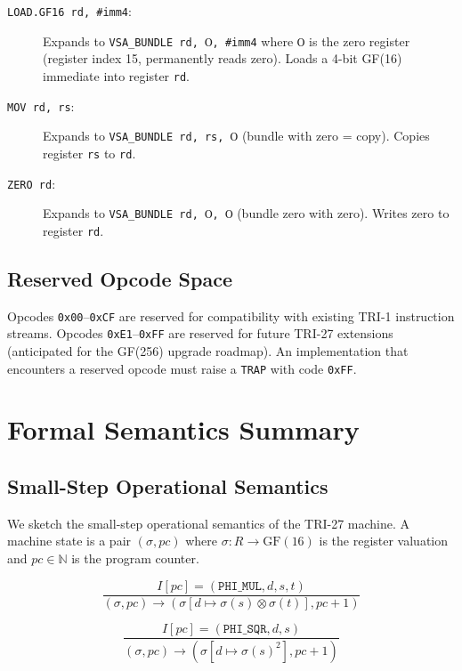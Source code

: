 \begin{description}
  \item[\texttt{LOAD.GF16 rd, \#imm4}:] Expands to
    \texttt{VSA\_BUNDLE rd, Ⲟ, \#imm4} where \texttt{Ⲟ} is the
    zero register (register index 15, permanently reads zero).
    Loads a 4-bit GF(16) immediate into register \texttt{rd}.
  \item[\texttt{MOV rd, rs}:] Expands to
    \texttt{VSA\_BUNDLE rd, rs, Ⲟ} (bundle with zero = copy).
    Copies register \texttt{rs} to \texttt{rd}.
  \item[\texttt{ZERO rd}:] Expands to
    \texttt{VSA\_BUNDLE rd, Ⲟ, Ⲟ} (bundle zero with zero).
    Writes zero to register \texttt{rd}.
\end{description}

\subsection{Reserved Opcode Space}
\label{subsec:71:reserved-opcodes}

Opcodes \texttt{0x00}--\texttt{0xCF} are reserved for compatibility
with existing TRI-1 instruction streams.  Opcodes \texttt{0xE1}--\texttt{0xFF}
are reserved for future TRI-27 extensions (anticipated for the
GF(256) upgrade roadmap).  An implementation that encounters a
reserved opcode must raise a \texttt{TRAP} with code \texttt{0xFF}.

\section{Formal Semantics Summary}
\label{sec:71:formal-semantics}

\subsection{Small-Step Operational Semantics}
\label{subsec:71:small-step}

We sketch the small-step operational semantics of the TRI-27
machine.  A machine state is a pair $(\sigma, \mathit{pc})$ where
$\sigma : R \to \mathrm{GF}(16)$ is the register valuation and
$\mathit{pc} \in \mathbb{N}$ is the program counter.

\[
  \frac{I[\mathit{pc}] = (\texttt{PHI\_MUL}, d, s, t)}
       {(\sigma, \mathit{pc}) \to
        (\sigma[d \mapsto \sigma(s) \otimes \sigma(t)], \mathit{pc}+1)}
\]

\[
  \frac{I[\mathit{pc}] = (\texttt{PHI\_SQR}, d, s)}
       {(\sigma, \mathit{pc}) \to
        (\sigma[d \mapsto \sigma(s)^2], \mathit{pc}+1)}
\]

